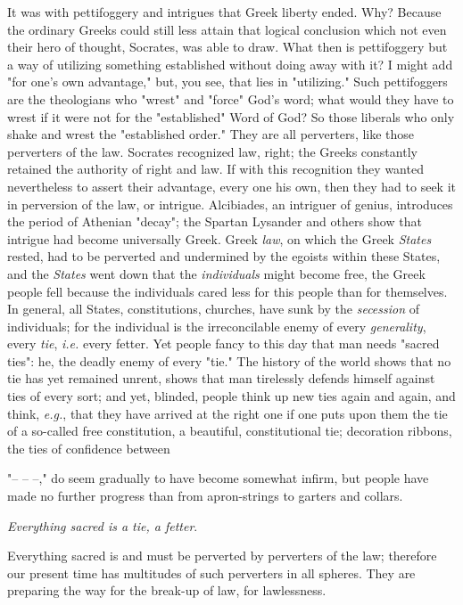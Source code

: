 \documentclass[a4paper]{book}
\begin{document}
It was with pettifoggery and intrigues that Greek liberty ended. Why? Because 
the ordinary Greeks could still less attain that logical conclusion which not 
even their hero of thought, Socrates, was able to draw. What then is 
pettifoggery but a way of utilizing something established without doing away 
with it? I might add "{}for one's own advantage,"{} but, you see, that lies in 
"{}utilizing."{} Such pettifoggers are the theologians who "{}wrest"{} and 
"{}force"{} God's word; what would they have to wrest if it were not for the 
"{}established"{} Word of God? So those liberals who only shake and wrest the 
"{}established order."{} They are all perverters, like those perverters of the 
law. Socrates recognized law, right; the Greeks constantly retained the 
authority of right and law. If with this recognition they wanted nevertheless 
to assert their advantage, every one his own, then they had to seek it in 
perversion of the law, or intrigue. Alcibiades, an intriguer of genius, 
introduces the period of Athenian "{}decay"{}; the Spartan Lysander and others 
show that intrigue had become universally Greek. Greek \textit{law}, on which 
the Greek \textit{States} rested, had to be perverted and undermined by the 
egoists within these States, and the \textit{States} went down that the 
\textit{individuals} might become free, the Greek people fell because the 
individuals cared less for this people than for themselves. In general, all 
States, constitutions, churches, have sunk by the \textit{secession} of 
individuals; for the individual is the irreconcilable enemy of every 
\textit{generality}, every \textit{tie}, \textit{i.e.} every fetter. Yet 
people fancy to this day that man needs "{}sacred ties"{}: he, the deadly 
enemy of every "{}tie."{} The history of the world shows that no tie has yet 
remained unrent, shows that man tirelessly defends himself against ties of 
every sort; and yet, blinded, people think up new ties again and again, and 
think, \textit{e.g.}, that they have arrived at the right one if one puts upon 
them the tie of a so-called free constitution, a beautiful, constitutional 
tie; decoration ribbons, the ties of confidence between

"{}-- -- --,"{} do seem gradually to have become somewhat infirm, but people 
have made no further progress than from apron-strings to garters and collars.

\textit{Everything sacred is a tie, a fetter}.

Everything sacred is and must be perverted by perverters of the law; therefore 
our present time has multitudes of such perverters in all spheres. They are 
preparing the way for the break-up of law, for lawlessness.
\end{document}
